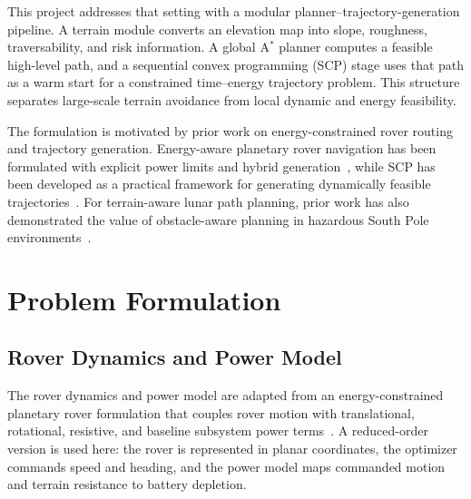 This project addresses that setting with a modular planner--trajectory-generation pipeline. A terrain module converts an elevation map into slope, roughness, traversability, and risk information. A global A$^\ast$ planner computes a feasible high-level path, and a sequential convex programming (SCP) stage uses that path as a warm start for a constrained time--energy trajectory problem. This structure separates large-scale terrain avoidance from local dynamic and energy feasibility.

The formulation is motivated by prior work on energy-constrained rover routing and trajectory generation. Energy-aware planetary rover navigation has been formulated with explicit power limits and hybrid generation~\cite{hu2025rover}, while SCP has been developed as a practical framework for generating dynamically feasible trajectories~\cite{malyuta2022scvx}. For terrain-aware lunar path planning, prior work has also demonstrated the value of obstacle-aware planning in hazardous South Pole environments~\cite{feng2025southpole}.

\section{Problem Formulation}
\subsection{Rover Dynamics and Power Model}
The rover dynamics and power model are adapted from an energy-constrained planetary rover formulation that couples rover motion with translational, rotational, resistive, and baseline subsystem power terms~\cite{hu2025rover}. A reduced-order version is used here: the rover is represented in planar coordinates, the optimizer commands speed and heading, and the power model maps commanded motion and terrain resistance to battery depletion.

